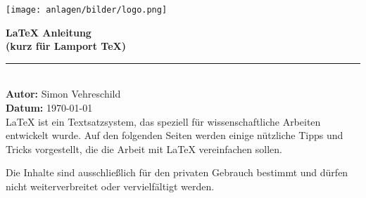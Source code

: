 \begin{titlepage}  %
    \begin{center}

        \vspace*{0.5cm}  %

        \texttt{[image: anlagen/bilder/logo.png]}
        \vspace{1cm}  %

        {\Huge \textbf{\LaTeX{} Anleitung}} \\[0.5cm]
        {\Large \textbf{(kurz für Lamport TeX)}} \\[1.5cm]

        \rule{12cm}{0.5pt} \\[1.5cm]  %

        \textbf{\Large Autor:} {\Large Simon Vehreschild} \\[0.5cm]
        \textbf{\Large Datum:} {\Large \today} \\[3cm]

        {\large \LaTeX{} ist ein Textsatzsystem, das speziell für wissenschaftliche Arbeiten entwickelt wurde.
        Auf den folgenden Seiten werden einige nützliche Tipps und Tricks vorgestellt, die die Arbeit mit \LaTeX{} vereinfachen sollen.}

        \vfill

        {\large Die Inhalte sind ausschließlich für den privaten Gebrauch bestimmt und dürfen nicht weiterverbreitet oder vervielfältigt werden.} \\[1cm]

        \vfill  %
    \end{center}
\end{titlepage}